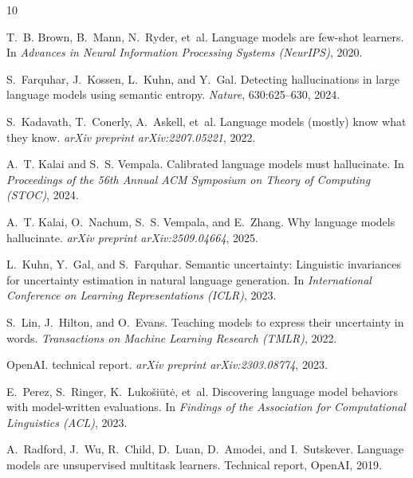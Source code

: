 \documentclass[11pt]{article}
\begin{document}

\begin{thebibliography}{10}

T.~B. Brown, B.~Mann, N.~Ryder, et~al.
\newblock Language models are few-shot learners.
\newblock In \emph{Advances in Neural Information Processing Systems (NeurIPS)}, 2020.

S.~Farquhar, J.~Kossen, L.~Kuhn, and Y.~Gal.
\newblock Detecting hallucinations in large language models using semantic entropy.
\newblock \emph{Nature}, 630:625--630, 2024.

S.~Kadavath, T.~Conerly, A.~Askell, et~al.
\newblock Language models (mostly) know what they know.
\newblock \emph{arXiv preprint arXiv:2207.05221}, 2022.

A.~T. Kalai and S.~S. Vempala.
\newblock Calibrated language models must hallucinate.
\newblock In \emph{Proceedings of the 56th Annual ACM Symposium on Theory of Computing (STOC)}, 2024.

A.~T. Kalai, O.~Nachum, S.~S. Vempala, and E.~Zhang.
\newblock Why language models hallucinate.
\newblock \emph{arXiv preprint arXiv:2509.04664}, 2025.

L.~Kuhn, Y.~Gal, and S.~Farquhar.
\newblock Semantic uncertainty: Linguistic invariances for uncertainty estimation in natural language generation.
\newblock In \emph{International Conference on Learning Representations (ICLR)}, 2023.

S.~Lin, J.~Hilton, and O.~Evans.
\newblock Teaching models to express their uncertainty in words.
\newblock \emph{Transactions on Machine Learning Research (TMLR)}, 2022.

OpenAI.
 technical report.
\newblock \emph{arXiv preprint arXiv:2303.08774}, 2023.

E.~Perez, S.~Ringer, K.~Luko\v{s}i\=ut\.e, et~al.
\newblock Discovering language model behaviors with model-written evaluations.
\newblock In \emph{Findings of the Association for Computational Linguistics (ACL)}, 2023.

A.~Radford, J.~Wu, R.~Child, D.~Luan, D.~Amodei, and I.~Sutskever.
\newblock Language models are unsupervised multitask learners.
\newblock Technical report, OpenAI, 2019.

\end{thebibliography}
\end{document}

